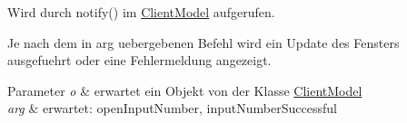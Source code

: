 Wird durch notify() im \hyperlink{a00003}{Client\-Model} aufgerufen. 

Je nach dem in arg uebergebenen Befehl wird ein Update des Fensters ausgefuehrt oder eine Fehlermeldung angezeigt.


\begin{DoxyParams}{Parameter}
{\em o} & erwartet ein Objekt von der Klasse \hyperlink{a00003}{Client\-Model} \\
\hline
{\em arg} & erwartet\-: open\-Input\-Number, input\-Number\-Successful \\
\hline
\end{DoxyParams}
